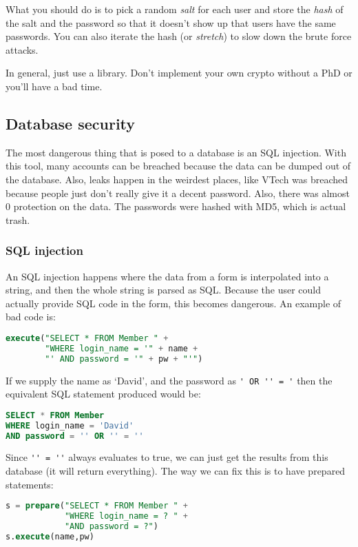 \documentclass[11pt,a4paper,titlepage,dvipsnames,cmyk]{scrartcl}
\begin{document}
What you should do is to pick a random \textit{salt} for each user and
store the \textit{hash} of the salt and the password so that it doesn't
show up that users have the same passwords. You can also iterate the hash
(or \textit{stretch}) to slow down the brute force attacks.

In general, just use a library. Don't implement your own crypto without a
PhD or you'll have a bad time.

\subsection{Database security}%
\label{ssec:Database security}
The most dangerous thing that is posed to a database is an SQL injection.
With this tool, many accounts can be breached because the data can be
dumped out of the database.
Also, leaks happen in the weirdest places, like VTech was breached because
people just don't really give it a decent password. Also, there was almost
0 protection on the data. The passwords were hashed with MD5, which is
actual trash.

\subsubsection{SQL injection}%
\label{ssub:SQL injection}
An SQL injection happens where the data from a form is interpolated into a
string, and then the whole string is parsed as SQL. Because the user could
actually provide SQL code in the form, this becomes dangerous. An example
of bad code is:

\begin{lstlisting}[language=SQL]
execute("SELECT * FROM Member " + 
        "WHERE login_name = '" + name +
        "' AND password = '" + pw + "'")
\end{lstlisting}

If we supply the name as `David', and the password as \lstinline|' OR '' = '| 
then the equivalent SQL statement produced would be:

\begin{lstlisting}[language=SQL]
SELECT * FROM Member
WHERE login_name = 'David'
AND password = '' OR '' = ''
\end{lstlisting}

Since \lstinline|'' = ''| always evaluates to true, we can just get the
results from this database (it will return everything). The way we can fix
this is to have prepared statements:

\begin{lstlisting}[language=SQL]
s = prepare("SELECT * FROM Member " +
            "WHERE login_name = ? " +
            "AND password = ?")
s.execute(name,pw)
\end{lstlisting}
\end{document}
